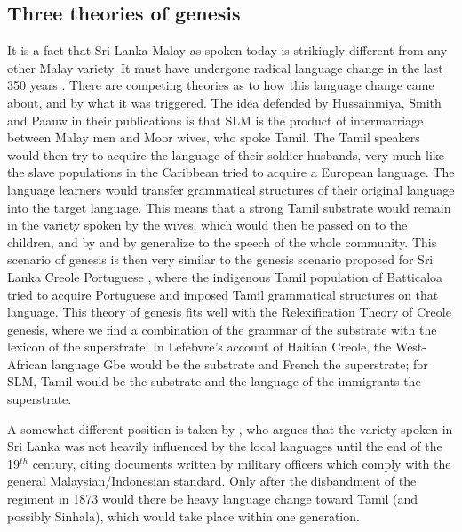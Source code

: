  

\subsection{Three theories of genesis}\label{sec:slmbg:Threetheoriesofgenesis}
It is a fact that Sri Lanka Malay as spoken today is strikingly different from any other Malay variety. It must have undergone radical language change in the last 350 years \citep{AnsaldoEtAl2009age}. There are competing theories as to how this language change came about, and by what it was triggered. The idea defended by Hussainmiya, Smith and Paauw in their publications \citep{SmithRH, SmithEtAl2004, SmithEtAl2006cll} is that SLM is the product of intermarriage between Malay men and Moor wives, who spoke Tamil. The Tamil speakers would then try to acquire the language of their soldier husbands,   very much like the slave populations in the Caribbean tried to acquire a European language. The language learners would transfer grammatical structures of their original language into the target language. This means that a strong Tamil substrate would remain in the  variety spoken by the wives, which would then be passed on to the children, and by and by generalize to the speech of the whole community. This scenario of genesis is then very similar to the genesis scenario proposed for  Sri Lanka Creole Portuguese \citep{Smith1979}, where the indigenous Tamil population of Batticaloa tried to acquire Portuguese and imposed Tamil grammatical structures on that language. This theory of genesis fits well with the Relexification Theory \citep{Muysken1981,Lefebvre2001} of Creole genesis, where we find a combination of the grammar of the substrate with the lexicon of the superstrate.  In Lefebvre's account of Haitian Creole, the West-African language Gbe would be the substrate and French the superstrate; for SLM, Tamil would be the substrate and the language of the immigrants the superstrate.

A somewhat different position is taken by \citet{Bakker2000convergence,Bakker2000rapid,Bakker2006}, who argues that the variety spoken in Sri Lanka was not heavily influenced by the local languages until the end of the 19$^{th}$ century, citing  documents written by military officers which comply with the general Malaysian/Indonesian standard. Only after the disbandment of the regiment in 1873 would there be heavy language change toward   Tamil (and possibly Sinhala), which would take place within one generation.

